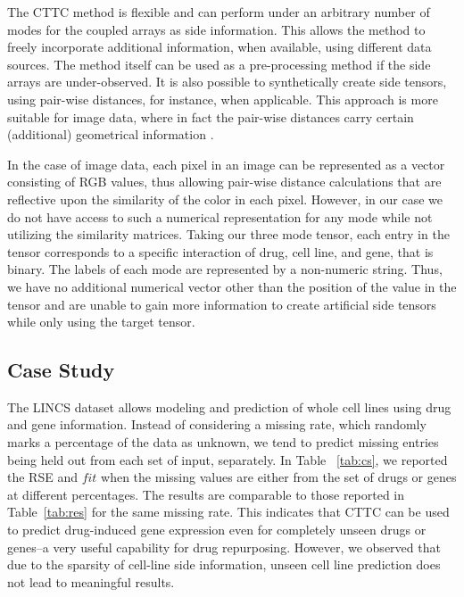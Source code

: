 \documentclass{article}
\begin{document}
The CTTC method is flexible and can perform under an arbitrary number of modes for the coupled arrays as side information. This allows the method to freely incorporate additional information, when available, using different data sources. The method itself can be used as a pre-processing method if the side arrays are under-observed. It is also possible to synthetically create side tensors, using pair-wise distances, for instance, when applicable. This approach is more suitable for image data, where in fact the pair-wise distances carry certain (additional) geometrical information  \cite{bagherian2022bilevel}. 

In the case of image data, each pixel in an image can be represented as a vector consisting of RGB values, thus allowing pair-wise distance calculations that are reflective upon the similarity of the color in each pixel. However, in our case we do not have access to such a numerical representation for any mode while not utilizing the similarity matrices. Taking our three mode tensor, each entry in the tensor corresponds to a specific interaction of drug, cell line, and gene, that is binary. The labels of each mode are represented by a non-numeric string. Thus, we have no additional numerical vector other than the position of the value in the tensor and are unable to gain more information to create artificial side tensors while only using the target tensor. 

\subsection{Case Study}
The LINCS dataset allows modeling and prediction of whole cell lines using drug and gene information. Instead of considering a missing rate, which randomly marks a percentage of the data as unknown, we tend to predict missing entries being held out from each set of input, separately. In Table ~\ref{tab:cs}, we reported the RSE and $fit$ when the missing values are either from the set of drugs or genes at different percentages. The results are comparable to those reported in Table~\ref{tab:res} for the same missing rate. This indicates that CTTC can be used to predict drug-induced gene expression even for completely unseen drugs or genes--a very useful capability for drug repurposing. However, we observed that due to the sparsity of cell-line side information, unseen cell line prediction does not lead to meaningful results.
\end{document}
